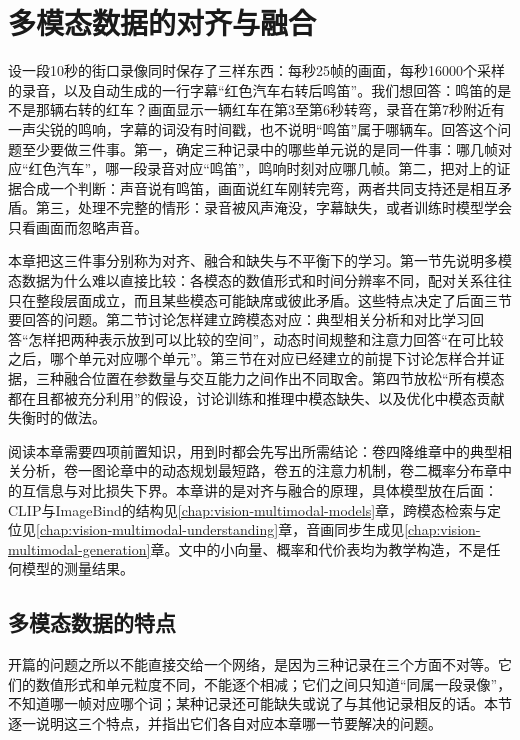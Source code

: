 \chapter{多模态数据的对齐与融合}
\label{chap:vision-multimodal-alignment}

设一段10秒的街口录像同时保存了三样东西：每秒25帧的画面，每秒16000个采样的录音，以及自动生成的一行字幕“红色汽车右转后鸣笛”。我们想回答：鸣笛的是不是那辆右转的红车？画面显示一辆红车在第3至第6秒转弯，录音在第7秒附近有一声尖锐的鸣响，字幕的词没有时间戳，也不说明“鸣笛”属于哪辆车。回答这个问题至少要做三件事。第一，确定三种记录中的哪些单元说的是同一件事：哪几帧对应“红色汽车”，哪一段录音对应“鸣笛”，鸣响时刻对应哪几帧。第二，把对上的证据合成一个判断：声音说有鸣笛，画面说红车刚转完弯，两者共同支持还是相互矛盾。第三，处理不完整的情形：录音被风声淹没，字幕缺失，或者训练时模型学会只看画面而忽略声音。

本章把这三件事分别称为对齐、融合和缺失与不平衡下的学习。第一节先说明多模态数据为什么难以直接比较：各模态的数值形式和时间分辨率不同，配对关系往往只在整段层面成立，而且某些模态可能缺席或彼此矛盾。这些特点决定了后面三节要回答的问题。第二节讨论怎样建立跨模态对应：典型相关分析和对比学习回答“怎样把两种表示放到可以比较的空间”，动态时间规整和注意力回答“在可比较之后，哪个单元对应哪个单元”。第三节在对应已经建立的前提下讨论怎样合并证据，三种融合位置在参数量与交互能力之间作出不同取舍。第四节放松“所有模态都在且都被充分利用”的假设，讨论训练和推理中模态缺失、以及优化中模态贡献失衡时的做法。

阅读本章需要四项前置知识，用到时都会先写出所需结论：卷四降维章中的典型相关分析，卷一图论章中的动态规划最短路，卷五的注意力机制，卷二概率分布章中的互信息与对比损失下界。本章讲的是对齐与融合的原理，具体模型放在后面：CLIP与ImageBind的结构见\ref{chap:vision-multimodal-models}章，跨模态检索与定位见\ref{chap:vision-multimodal-understanding}章，音画同步生成见\ref{chap:vision-multimodal-generation}章。文中的小向量、概率和代价表均为教学构造，不是任何模型的测量结果。

\section{多模态数据的特点}
\label{sec:vision-alignment-characteristics}

开篇的问题之所以不能直接交给一个网络，是因为三种记录在三个方面不对等。它们的数值形式和单元粒度不同，不能逐个相减；它们之间只知道“同属一段录像”，不知道哪一帧对应哪个词；某种记录还可能缺失或说了与其他记录相反的话。本节逐一说明这三个特点，并指出它们各自对应本章哪一节要解决的问题。


